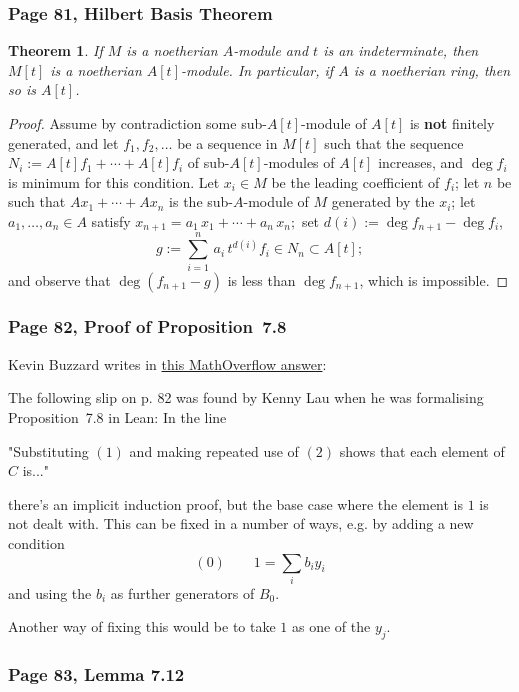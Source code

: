 \documentclass[12pt,letterpaper]{article}%
\newtheorem{thm}{Theorem}%
\begin{document}
\subsubsection{Page 81, Hilbert Basis Theorem}%

\begin{thm}\label{hbt}
If $M$ is a noetherian $A$-module and $t$ is an indeterminate, then $M[t]$ is a noetherian $A[t]$-module. In particular, if $A$ is a noetherian ring, then so is $A[t]$.
\end{thm}

\begin{proof}
Assume by contradiction some sub-$A[t]$-module of $A[t]$ is \textbf{not} finite\-ly generated, and let $f_1,f_2,\dots$ be a sequence in $M[t]$ such that the sequence $N_i:=A[t]f_1+\cdots+A[t]f_i$ of sub-$A[t]$-modules of $A[t]$ increases, and $\deg f_i$ is minimum for this condition. Let $x_i\in M$ be the leading coefficient of $f_i$; let $n$ be such that $Ax_1+\cdots+Ax_n$ is the sub-$A$-module of $M$ generated by the $x_i$; let $a_1,\dots,a_n\in A$ satisfy 
$
x_{n+1}=a_1\,x_1+\cdots+a_n\,x_n;
$ 
set $d(i):=\deg f_{n+1}-\deg f_i$, 
$$
g:=\sum_{i=1}^n\,a_i\,t^{d(i)}f_i\in N_n\subset A[t];
$$ 
and observe that $\deg(f_{n+1}-g)$ is less than $\deg f_{n+1}$, which is impossible.
\end{proof}

\subsubsection{Page 82, Proof of Proposition~7.8}%

Kevin Buzzard writes in \href{https://mathoverflow.net/a/372412/461}{this MathOverflow answer}:

{\footnotesize The following slip on p. 82 was found by Kenny Lau when he was formalising Proposition~7.8 in Lean: In the line 

"Substituting $(1)$ and making repeated use of $(2)$ shows that each element of $C$ is..." 

\noindent there's an implicit induction proof, but the base case where the element is $1$ is not dealt with. This can be fixed in a number of ways, e.g. by adding a new condition 
$$
(0)\qquad1=\sum_i b_i y_i
$$ 
and using the $b_i$ as further generators of $B_0$.} 

Another way of fixing this would be to take $1$ as one of the $y_j$. 

\subsubsection{Page 83, Lemma 7.12}%
\end{document}
